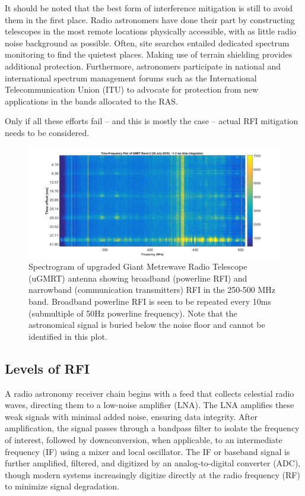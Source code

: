 It should be noted that the best form of interference mitigation is still to avoid them in the first place. Radio astronomers have done their part by constructing telescopes in the most remote locations physically accessible, with as little radio noise background as possible. Often, site searches entailed dedicated spectrum monitoring to find the quietest places. Making use of terrain shielding provides additional protection. Furthermore, astronomers participate in national and international spectrum management forums such as the International Telecommunication Union (ITU) to advocate for protection from new applications in the bands allocated to the RAS.

Only if all these efforts fail -- and this is mostly the case -- actual RFI mitigation needs to be considered.


\begin{figure}
    \centering
    \includegraphics[scale=0.25]{Hardware Excision Techniques/figures/time_freq(1).jpg}
    \caption{Spectrogram of upgraded Giant Metrewave Radio Telescope (uGMRT) \citep{gupta2017upgraded} antenna showing broadband (powerline RFI) and narrowband (communication transmitters) RFI in the 250-500 MHz band. Broadband powerline RFI is seen to be repeated every 10ms (submultiple of 50Hz powerline frequency). Note that the astronomical signal is buried below the noise floor and cannot be identified in this plot.}
    \label{fig:ugmrt-rfi}
\end{figure}




\subsection{Levels of RFI}
\label{subsection:hardware:introduction: levels}
A radio astronomy receiver chain begins with a feed that collects celestial radio waves, directing them to a low-noise amplifier (LNA). The LNA amplifies these weak signals with minimal added noise, ensuring data integrity. After amplification, the signal passes through a bandpass filter to isolate the frequency of interest, followed by downconversion, when applicable, to an intermediate frequency (IF) using a mixer and local oscillator. The IF or baseband signal is further amplified, filtered, and digitized by an analog-to-digital converter (ADC), though modern systems increasingly digitize directly at the radio frequency (RF) to minimize signal degradation.

